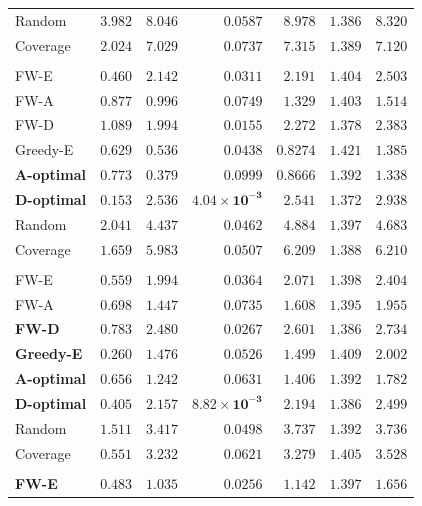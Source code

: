 \documentclass[letterpaper, 9
 pt, conference]{ieeeconf}
\begin{document}
\begin{table}[ht]
\begin{tabular}{lrrrrrr}
Random & $3.982$ & $8.046$ & $0.0587$ & $8.978$ & $1.386$ & $8.320$ \\
Coverage & $2.024$ & $7.029$ & $0.0737$ & $7.315$ & $1.389$ & $7.120$ \\
\addlinespace[1pt]
\multicolumn{7}{l}{\textit{$K{=}15$}} \\[1pt]
FW-E & $0.460$ & $2.142$ & $0.0311$ & $2.191$ & $1.404$ & $2.503$ \\
FW-A & $0.877$ & $0.996$ & $0.0749$ & $1.329$ & $1.403$ & $1.514$ \\
FW-D & $1.089$ & $1.994$ & $0.0155$ & $2.272$ & $1.378$ & $2.383$ \\
Greedy-E & $0.629$ & $0.536$ & $0.0438$ & $\mathbf{0.8274}$ & $1.421$ & $1.385$ \\
\textbf{A-optimal} & $0.773$ & $\mathbf{0.379}$ & $0.0999$ & $0.8666$ & $1.392$ & $\mathbf{1.338}$ \\
\textbf{D-optimal} & $\mathbf{0.153}$ & $2.536$ & $\mathbf{4.04\!\times\!10^{-3}}$ & $2.541$ & $\mathbf{1.372}$ & $2.938$ \\
Random & $2.041$ & $4.437$ & $0.0462$ & $4.884$ & $1.397$ & $4.683$ \\
Coverage & $1.659$ & $5.983$ & $0.0507$ & $6.209$ & $1.388$ & $6.210$ \\
\addlinespace[1pt]
\multicolumn{7}{l}{\textit{$K{=}20$}} \\[1pt]
FW-E & $0.559$ & $1.994$ & $0.0364$ & $2.071$ & $1.398$ & $2.404$ \\
FW-A & $0.698$ & $1.447$ & $0.0735$ & $1.608$ & $1.395$ & $1.955$ \\
\textbf{FW-D} & $0.783$ & $2.480$ & $0.0267$ & $2.601$ & $\mathbf{1.386}$ & $2.734$ \\
\textbf{Greedy-E} & $\mathbf{0.260}$ & $1.476$ & $0.0526$ & $1.499$ & $1.409$ & $2.002$ \\
\textbf{A-optimal} & $0.656$ & $\mathbf{1.242}$ & $0.0631$ & $\mathbf{1.406}$ & $1.392$ & $\mathbf{1.782}$ \\
\textbf{D-optimal} & $0.405$ & $2.157$ & $\mathbf{8.82\!\times\!10^{-3}}$ & $2.194$ & $1.386$ & $2.499$ \\
Random & $1.511$ & $3.417$ & $0.0498$ & $3.737$ & $1.392$ & $3.736$ \\
Coverage & $0.551$ & $3.232$ & $0.0621$ & $3.279$ & $1.405$ & $3.528$ \\
\addlinespace[1pt]
\multicolumn{7}{l}{\textit{$K{=}30$}} \\[1pt]
\textbf{FW-E} & $0.483$ & $1.035$ & $\mathbf{0.0256}$ & $1.142$ & $1.397$ & $1.656$ \\

\end{tabular}
\end{table}
\end{document}
